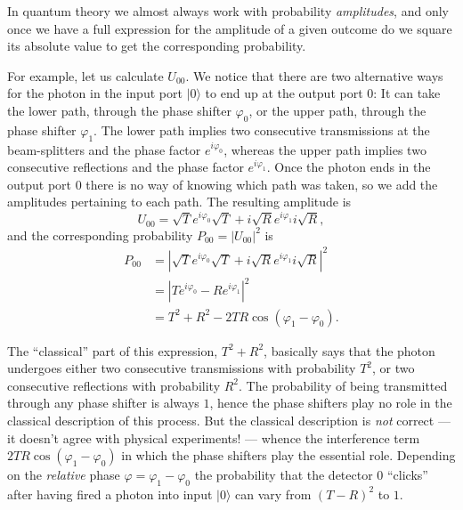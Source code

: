 \documentclass[fleqn,a4paper]{article}
\newenvironment{idea}{\everypar{\setlength{\parindent}{1.5em}}}{}
\theoremstyle{definition}
\theoremstyle{definition}
\theoremstyle{definition}
\theoremstyle{definition}
\theoremstyle{remark}
\begin{document}
\begin{idea}
In quantum theory we almost always work with probability \emph{amplitudes}, and only once we have a full expression for the amplitude of a given outcome do we square its absolute value to get the corresponding probability.

\end{idea}

For example, let us calculate \(U_{00}\).
We notice that there are two alternative ways for the photon in the input port \(|0\rangle\) to end up at the output port \(0\): It can take the lower path, through the phase shifter \(\varphi_0\), or the upper path, through the phase shifter \(\varphi_1\).
The lower path implies two consecutive transmissions at the beam-splitters and the phase factor \(e^{i\varphi_0}\), whereas the upper path implies two consecutive reflections and the phase factor \(e^{i\varphi_1}\).
Once the photon ends in the output port \(0\) there is no way of knowing which path was taken, so we add the amplitudes pertaining to each path.
The resulting amplitude is
\[
  U_{00}
  = \sqrt{T} e^{i\varphi_0} \sqrt{T} + i\sqrt{R} e^{i\varphi_1} i \sqrt{R},
\]
and the corresponding probability \(P_{00}=|U_{00}|^2\) is
\[
  \begin{aligned}
    P_{00}
    & = \left\vert
          \sqrt{T}e^{i\varphi_0}\sqrt{T} + i\sqrt{R}e^{i\varphi_1}i\sqrt{R}
        \right\vert^2
  \\&= \left\vert
          Te^{i\varphi_0} - Re^{i\varphi_1}
        \right\vert^2
  \\& = T^2 + R^2
        - 2TR\cos(\varphi_1-\varphi_0).
  \end{aligned}
\]

The ``classical'' part of this expression, \(T^2+R^2\), basically says that the photon undergoes either two consecutive transmissions with probability \(T^2\), or two consecutive reflections with probability \(R^2\).
The probability of being transmitted through any phase shifter is always \(1\), hence the phase shifters play no role in the classical description of this process.
But the classical description is \emph{not} correct --- it doesn't agree with physical experiments! --- whence the interference term \(2TR\cos(\varphi_1-\varphi_0)\) in which the phase shifters play the essential role.
Depending on the \emph{relative} phase \(\varphi=\varphi_1-\varphi_0\) the probability that the detector \(0\) ``clicks'' after having fired a photon into input \(|0\rangle\) can vary from \((T-R)^2\) to \(1\).
\end{document}
